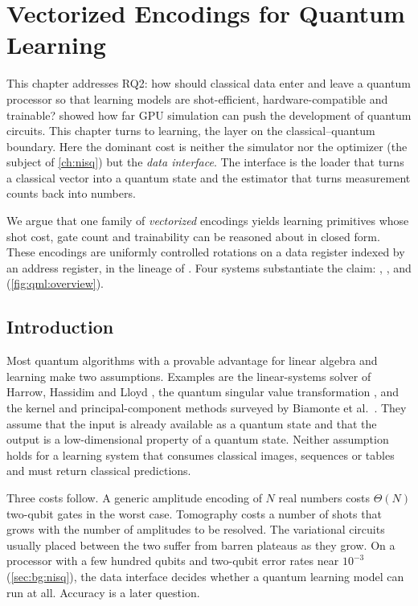\chapter{Vectorized Encodings for Quantum Learning}\label{ch:qml}

This chapter addresses RQ2: how should classical data enter and leave a quantum processor so that learning models are shot-efficient, hardware-compatible and trainable?  showed how far GPU simulation can push the development of quantum circuits. This chapter turns to learning, the layer on the classical--quantum boundary. Here the dominant cost is neither the simulator nor the optimizer (the subject of \cref{ch:nisq}) but the \emph{data interface}. The interface is the loader that turns a classical vector into a quantum state and the estimator that turns measurement counts back into numbers.

We argue that one family of \emph{vectorized} encodings yields learning primitives whose shot cost, gate count and trainability can be reasoned about in closed form. These encodings are uniformly controlled rotations on a data register indexed by an address register, in the lineage of \qcrank{} \cite{balewski2024qcrank}. Four systems substantiate the claim: \qpie{}, \vqt{}, \shardq{} and \nnqa{} (\cref{fig:qml:overview}).

\section{Introduction}\label{sec:qml:intro}

Most quantum algorithms with a provable advantage for linear algebra and learning make two assumptions. Examples are the linear-systems solver of Harrow, Hassidim and Lloyd \cite{harrow2009hhl}, the quantum singular value transformation \cite{gilyen2019qsvt}, and the kernel and principal-component methods surveyed by Biamonte et al.~\cite{biamonte2017qml}. They assume that the input is already available as a quantum state and that the output is a low-dimensional property of a quantum state. Neither assumption holds for a learning system that consumes classical images, sequences or tables and must return classical predictions.

Three costs follow. A generic amplitude encoding of $N$ real numbers costs $\Theta(N)$ two-qubit gates in the worst case. Tomography costs a number of shots that grows with the number of amplitudes to be resolved. The variational circuits usually placed between the two suffer from barren plateaus \cite{mcclean2018barren} as they grow. On a processor with a few hundred qubits and two-qubit error rates near $10^{-3}$ (\cref{sec:bg:nisq}), the data interface decides whether a quantum learning model can run at all. Accuracy is a later question.


